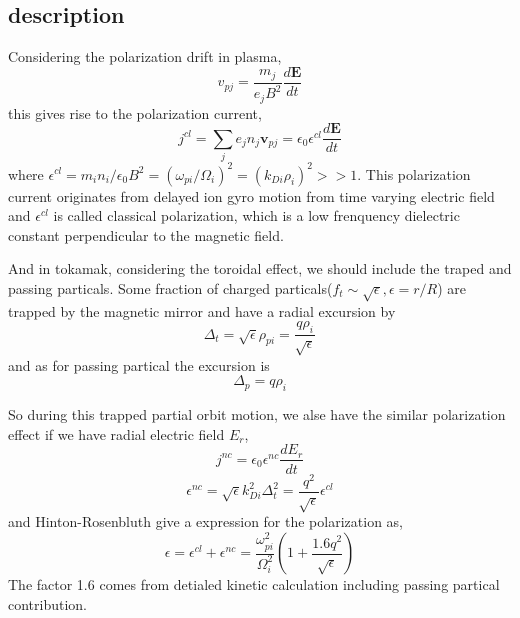 \documentclass[11pt,a4paper]{article}
\begin{document}
	\subsection{description}
	Considering the polarization drift in plasma, 
\begin{equation}
	v_{pj}=\frac{m_j}{e_jB^2}\frac{d\pmb{E}}{dt}
	\end{equation}
	this gives rise to the polarization current,
	\begin{equation}
	j^{cl}=\sum_{j}{e_jn_j\pmb{v}_{pj}}=\epsilon_0\epsilon^{cl}\frac{d\pmb{E}}{dt}
	\end{equation}
	where $\epsilon^{cl}=m_in_i/\epsilon_0B^2=(\omega_{pi}/\Omega_i)^2=(k_{Di}\rho_i)^2>>1$. This polarization current originates from delayed ion gyro motion from time varying electric field and $\epsilon^{cl}$ is called classical polarization, which is a low frenquency dielectric constant perpendicular to the magnetic field.

	And in tokamak, considering the toroidal effect, we should include the traped and passing particals. Some fraction of charged particals($f_t\sim\sqrt{\epsilon},\epsilon=r/R$) are trapped by the magnetic mirror and have a radial excursion by 
	\begin{equation}
		\Delta_t=\sqrt{\epsilon}\rho_{pi}=\frac{q\rho_i}{\sqrt{\epsilon}}
	\end{equation}
	and as for passing partical the excursion is
	\begin{equation}
		\Delta_p=q\rho_i
	\end{equation}
	
	So during this trapped partial orbit motion, we alse have the similar polarization effect if we have radial electric field $E_r$, 
	\begin{equation}
		j^{nc}=\epsilon_0\epsilon^{nc}\frac{dE_r}{dt}
	\end{equation}
	\begin{equation}
		\epsilon^{nc}=\sqrt{\epsilon}k_{Di}^2\Delta_t^2=\frac{q^2}{\sqrt{\epsilon}}\epsilon^{cl}
	\end{equation}
	and Hinton-Rosenbluth give a expression for the polarization as,
	\begin{equation}
		\epsilon=\epsilon^{cl}+\epsilon^{nc}=\frac{\omega_{pi}^2}{\Omega_i^2}(1+\frac{1.6q^2}{\sqrt{\epsilon}})
	\end{equation}
	The factor 1.6 comes from detialed kinetic calculation including passing partical contribution.
	
\end{document}
